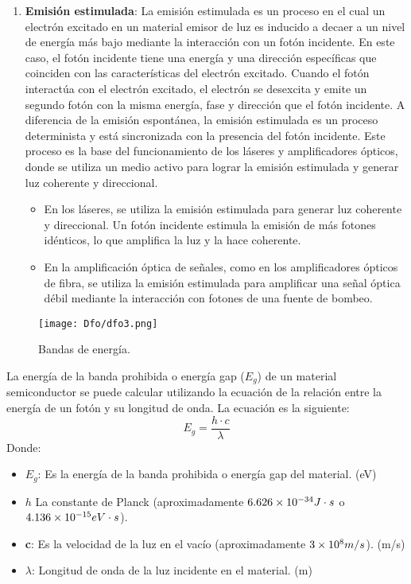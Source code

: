 \documentclass[
	12pt, %
	fleqn, %
	a4paper, %
	oneside, %
]{LegrandOrangeBook}
\begin{document}
\begin{enumerate}
\item \textbf{Emisión estimulada}: La emisión estimulada es un proceso en el cual un electrón excitado en un material emisor de luz es inducido a decaer a un nivel de energía más bajo mediante la interacción con un fotón incidente. En este caso, el fotón incidente tiene una energía y una dirección específicas que coinciden con las características del electrón excitado. Cuando el fotón interactúa con el electrón excitado, el electrón se desexcita y emite un segundo fotón con la misma energía, fase y dirección que el fotón incidente. A diferencia de la emisión espontánea, la emisión estimulada es un proceso determinista y está sincronizada con la presencia del fotón incidente. Este proceso es la base del funcionamiento de los láseres y amplificadores ópticos, donde se utiliza un medio activo para lograr la emisión estimulada y generar luz coherente y direccional.
\begin{itemize}
\item En los láseres, se utiliza la emisión estimulada para generar luz coherente y direccional. Un fotón incidente estimula la emisión de más fotones idénticos, lo que amplifica la luz y la hace coherente.
\item En la amplificación óptica de señales, como en los amplificadores ópticos de fibra, se utiliza la emisión estimulada para amplificar una señal óptica débil mediante la interacción con fotones de una fuente de bombeo.
\end{itemize}
\end{enumerate}
\begin{figure}[H]
\centering
\texttt{[image: Dfo/dfo3.png]}
\caption{Bandas de energía.}
\end{figure}
\begin{definition}
La energía de la banda prohibida o energía gap ($E_g$) de un material semiconductor se puede calcular utilizando la ecuación de la relación entre la energía de un fotón y su longitud de onda. La ecuación es la siguiente:
\begin{equation}
E_g=\frac{h\cdot c}{\lambda}
\label{eq:energiaGap}
\end{equation}
Donde:
\begin{itemize}
\item $E_g$: Es la energía de la banda prohibida o energía gap del material. (eV)
\item $h$ La constante de Planck (aproximadamente $6.626\times 10^{-34} J\cdot s $  o $4.136\times 10^{-15} eV\cdot s$).
\item \textbf{c}: Es la velocidad de la luz en el vacío (aproximadamente $3\times 10^{8}m/s$). (m/s)
\item $\lambda$: Longitud de onda de la luz incidente en el material. (m)
\end{itemize}
\end{definition}
\end{document}
